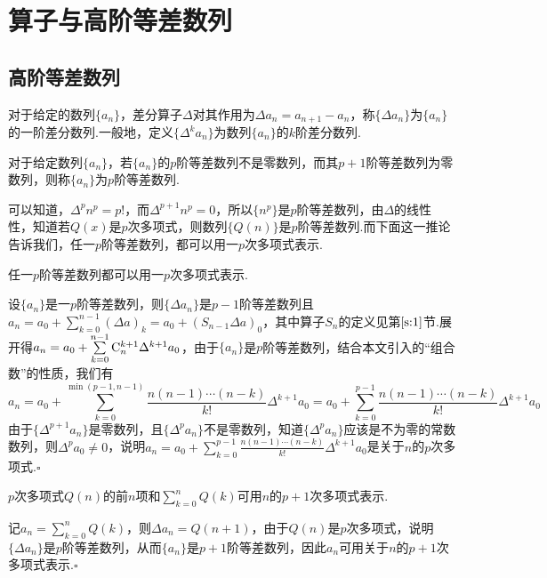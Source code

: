 \documentclass[10pt]{article}
\newcommand*{\QEDB}{\hfill\ensuremath{\square}}  %
\newcommand*{\SL}{\sum\limits}
\newcommand*{\rC}{{\rm C}}
\numberwithin{equation}{section}
\begin{document}
\section{算子与高阶等差数列}\label{gjdc}
\subsection{高阶等差数列}
对于给定的数列$\{a_n\}$，差分算子$\Delta$对其作用为$\Delta a_n = a_{n+1}-a_{n}$，称$\{\Delta a_n\}$为$\{a_n\}$的一阶差分数列.一般地，定义$\{\Delta^k a_n\}$为数列$\{a_n\}$的$k$阶差分数列.
\par 对于给定数列$\{a_n\}$，若$\{a_n\}$的$p$阶等差数列不是零数列，而其$p+1$阶等差数列为零数列，则称$\{a_n\}$为$p$阶等差数列.
\par 可以知道，$\Delta^p n^p = p!$，而$\Delta^{p+1} n^p = 0$，所以$\{n^p\}$是$p$阶等差数列，由$\Delta$的线性性，知道若$Q(x)$是$p$次多项式，则数列$\{Q(n)\}$是$p$阶等差数列.而下面这一推论告诉我们，任一$p$阶等差数列，都可以用一$p$次多项式表示.
\begin{TL} \label{tl1:1}
    任一$p$阶等差数列都可以用一$p$次多项式表示.
\end{TL}
\begin{ZM}
    设$\{a_n\}$是一$p$阶等差数列，则$\{\Delta a_n\}$是$p-1$阶等差数列且$a_n = a_0 + \SL_{k=0}^{n-1}{(\Delta a)_k} = a_0 + (S_{n-1}\Delta a)_0$，其中算子$S_n$的定义见第$\ref{s:1}$节.展开得$a_n = a_0 + \SL_{k=0}^{n-1}{\rC_{n}^{k+1}\Delta^{k+1}a_0}$，由于$\{a_n\}$是$p$阶等差数列，结合本文引入的“组合数”的性质，我们有
    $$a_n = a_0 + \sum_{k=0}^{\min(p-1,n-1)}{\frac{n(n-1)\cdots (n-k)}{k!}\Delta^{k+1}a_0} =  a_0 + \sum_{k=0}^{p-1}{\frac{n(n-1)\cdots (n-k)}{k!}\Delta^{k+1}a_0}$$
    由于$\{\Delta^{p+1}a_n\}$是零数列，且$\{\Delta^{p}a_n\}$不是零数列，知道$\{\Delta^{p}a_n\}$应该是不为零的常数数列，则$\Delta^{p}a_0 \ne 0$，说明$a_n =a_0 + \SL_{k=0}^{p-1}{\frac{n(n-1)\cdots (n-k)}{k!}\Delta^{k+1}a_0}$是关于$n$的$p$次多项式.\QEDB
\end{ZM}
\begin{TL}
    $p$次多项式$Q(n)$的前$n$项和$\SL_{k=0}^{n}{Q(k)}$可用$n$的$p+1$次多项式表示.
\end{TL}
\begin{ZM}
    记$a_n = \SL_{k=0}^{n}{Q(k)}$，则$\Delta a_n = Q(n+1)$，由于$Q(n)$是$p$次多项式，说明$\{\Delta a_n\}$是$p$阶等差数列，从而$\{a_n\}$是$p+1$阶等差数列，因此$a_n$可用关于$n$的$p+1$次多项式表示.\QEDB
\end{ZM}
\end{document}

